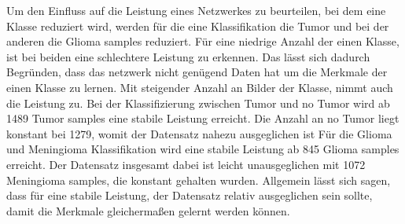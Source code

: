 Um den Einfluss auf die Leistung eines Netzwerkes zu beurteilen, bei dem eine Klasse reduziert wird,
werden für die eine Klassifikation die Tumor und bei der anderen die Glioma samples reduziert.
Für eine niedrige Anzahl der einen Klasse, ist bei beiden eine schlechtere Leistung zu erkennen.
Das lässt sich dadurch Begründen, dass das netzwerk nicht genügend Daten hat um die Merkmale der einen Klasse zu lernen.
Mit steigender Anzahl an Bilder der Klasse, nimmt auch die Leistung zu.
Bei der Klassifizierung zwischen Tumor und no Tumor wird ab 1489 Tumor samples eine stabile Leistung erreicht.
Die Anzahl an no Tumor liegt konstant bei 1279, womit der Datensatz nahezu ausgeglichen ist
Für die Glioma und Meningioma Klassifikation wird eine stabile Leistung ab 845 Glioma samples erreicht.
Der Datensatz insgesamt dabei ist leicht unausgeglichen mit 1072 Meningioma samples, die konstant gehalten wurden.
Allgemein lässt sich sagen, dass für eine stabile Leistung, der Datensatz relativ ausgeglichen sein sollte, damit die Merkmale gleichermaßen gelernt werden können. 
